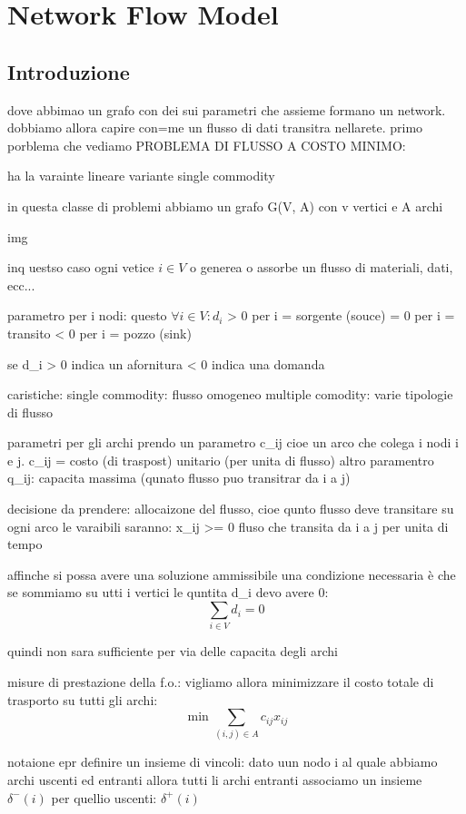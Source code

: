 \newpage
\section{Network Flow Model}


\subsection{Introduzione}
dove abbimao un grafo  con dei sui parametri che assieme formano un network. dobbiamo allora capire con=me un flusso di dati transitra nellarete.
primo porblema che vediamo
PROBLEMA DI FLUSSO A COSTO MINIMO:

ha la varainte lineare
variante single commodity


in questa classe di problemi abbiamo un grafo G(V, A)
con v vertici e A archi

img


inq uestso caso ogni vetice $i \in V$ o generea o assorbe un flusso di materiali, dati, ecc...

parametro per i nodi:
questo $\forall i \in V: d_i$
> 0 per i = sorgente (souce)
= 0 per i = transito
< 0 per i = pozzo (sink)


se d_i > 0 indica un afornitura
< 0 indica una domanda

caristiche:
single commodity: flusso omogeneo
multiple comodity: varie tipologie di flusso 


parametri per gli archi
prendo un parametro c_{ij} cioe un arco che colega i nodi i e j. c_{ij} = costo (di traspost) unitario (per unita di flusso)
altro paramentro q_{ij}: capacita massima (qunato flusso puo transitrar da i a j)


decisione da prendere: allocaizone del flusso, cioe qunto flusso deve transitare su ogni arco
le varaibili saranno: x_{ij} >= 0 fluso che transita da i a j per unita di tempo


affinche si possa avere una soluzione ammissibile una condizione necessaria è che se sommiamo su utti i vertici le quntita d_i devo avere 0:
$$\sum_{i\in V} d_i = 0$$

quindi non sara sufficiente per via delle capacita degli archi



misure di prestazione della f.o.:
vigliamo allora minimizzare il costo totale di trasporto su tutti gli archi:
$$\min \sum_{(i,j)\in A} c_{ij} x_{ij}$$

notaione epr definire un insieme di vincoli:
dato uun nodo i al quale abbiamo archi uscenti ed entranti allora tutti li archi entranti associamo un insieme $\delta^-(i)$ per quellio uscenti: $\delta^+(i)$


